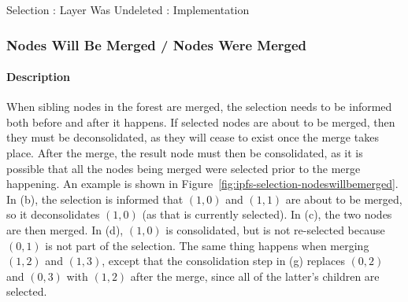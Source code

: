 \begin{stulisting}[p]
\caption{Selection : Layer Was Undeleted : Implementation}
\label{code:ipfs-selection-layerwasundeleted}

\end{stulisting}

\afterpage{\clearpage}
\newpage

\subsubsection{Nodes Will Be Merged / Nodes Were Merged}

\paragraph{Description}

When sibling nodes in the forest are merged, the selection needs to be informed both before and after it happens. If selected nodes are about to be merged, then they must be deconsolidated, as they will cease to exist once the merge takes place. After the merge, the result node must then be consolidated, as it is possible that all the nodes being merged were selected prior to the merge happening. An example is shown in Figure~\ref{fig:ipfs-selection-nodeswillbemerged}. In (b), the selection is informed that $(1,0)$ and $(1,1)$ are about to be merged, so it deconsolidates $(1,0)$ (as that is currently selected). In (c), the two nodes are then merged. In (d), $(1,0)$ is consolidated, but is not re-selected because $(0,1)$ is not part of the selection. The same thing happens when merging $(1,2)$ and $(1,3)$, except that the consolidation step in (g) replaces $(0,2)$ and $(0,3)$ with $(1,2)$ after the merge, since all of the latter's children are selected.

